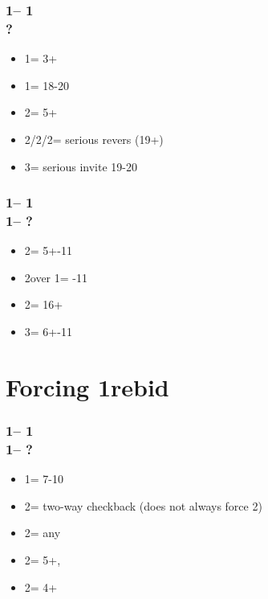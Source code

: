\documentclass[12pt, a4paper]{report}
\begin{document}
{{{            \subsubsection*{1\clubs -- 1\diams\\
                            ?}
            \begin{itemize}
                \item 1\major = 3+
                \item 1\nt = 18-20 \bal
                \item 2\clubs = 5+\clubs
                \item 2\diams/2\hearts/2\spades = serious revers (19+)
                \item 3\clubs = serious invite 19-20
            \end{itemize}

            \subsubsection*{1\clubs -- 1\diams\\
                            1\major -- ?}
            \begin{itemize}
                \item 2\diams = 5+-11
                \item 2\spades over 1\hearts = -11
                \item 2\nt = 16+ \bal
                \item 3\minor = 6+-11
            \end{itemize}
        }

        \section*{\colorbox{blue!30}{Forcing 1\spades rebid}}
         {

            \subsubsection*{1\clubs -- 1\hearts\\
                            1\spades -- ?}
            \begin{itemize}
                \item 1\nt = 7-10 \bal
                \item 2\clubs = two-way checkback (does not always force 2\diams)
                \item 2\diams = any \gf
                \item 2\hearts = 5+\hearts, \nf
                \item 2\spades = 4+\spades
            \end{itemize}

}}}
\end{document}
